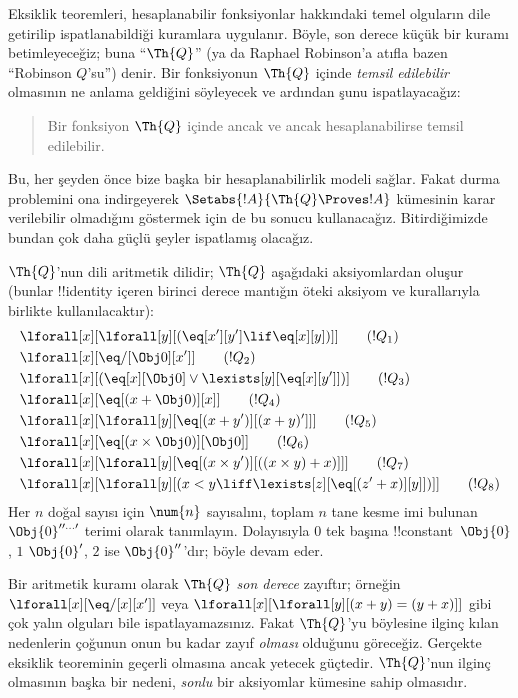 


Eksiklik teoremleri, hesaplanabilir fonksiyonlar hakkındaki temel olguların
dile getirilip ispatlanabildiği kuramlara uygulanır. Böyle, son derece küçük
bir kuramı betimleyeceğiz; buna ``$\Th{Q}$'' (ya da Raphael Robinson'a
atıfla bazen ``Robinson $Q$'su'') denir. Bir fonksiyonun $\Th{Q}$ içinde
\emph{temsil edilebilir} olmasının ne anlama geldiğini söyleyecek ve ardından
şunu ispatlayacağız:
\begin{quote}
  Bir fonksiyon $\Th{Q}$ içinde ancak ve ancak hesaplanabilirse temsil
  edilebilir.
\end{quote}
Bu, her şeyden önce bize başka bir hesaplanabilirlik modeli sağlar. Fakat
durma problemini ona indirgeyerek $\Setabs{!A}{\Th{Q} \Proves !A}$ kümesinin
karar verilebilir olmadığını göstermek için de bu sonucu kullanacağız.
Bitirdiğimizde bundan çok daha güçlü şeyler ispatlamış olacağız.

$\Th{Q}$'nun dili aritmetik dilidir; $\Th{Q}$ aşağıdaki aksiyomlardan oluşur
(bunlar !!{identity} içeren birinci derece mantığın öteki aksiyom ve
kurallarıyla birlikte kullanılacaktır):
\begin{align*}
& \lforall[x][\lforall[y][(\eq[x'][y'] \lif \eq[x][y])]] \tag{$!Q_1$}\\
& \lforall[x][\eq/[\Obj 0][x']] \tag{$!Q_2$}\\
& \lforall[x][(\eq[x][\Obj 0] \lor \lexists[y][\eq[x][y']])] \tag{$!Q_3$}\\
& \lforall[x][\eq[(x + \Obj 0)][x]] \tag{$!Q_4$}\\
& \lforall[x][\lforall[y][\eq[(x + y')][(x + y)']]] \tag{$!Q_5$}\\
& \lforall[x][\eq[(x \times \Obj 0)][\Obj 0]] \tag{$!Q_6$}\\
& \lforall[x][\lforall[y][\eq[(x \times y')][((x \times y) + x)]]] \tag{$!Q_7$}\\
& \lforall[x][\lforall[y][(x < y \liff \lexists[z][\eq[(z' + x)][y]])]] \tag{$!Q_8$}
\end{align*}
Her $n$ doğal sayısı için $\num{n}$ sayısalını, toplam $n$ tane kesme imi
bulunan $\Obj{0}^{\prime\prime\ldots\prime}$ terimi olarak tanımlayın.
Dolayısıyla $\num{0}$ tek başına !!{constant}~$\Obj{0}$, $\num{1}$
$\Obj{0}'$, $\num{2}$ ise $\Obj{0}''$'dır; böyle devam eder.

Bir aritmetik kuramı olarak $\Th{Q}$ \emph{son derece} zayıftır; örneğin
$\lforall[x][\eq/[x][x']]$ veya $\lforall[x][\lforall[y][(x + y) = (y +
    x)]]$ gibi çok yalın olguları bile ispatlayamazsınız. Fakat
$\Th{Q}$'yu böylesine ilginç kılan nedenlerin çoğunun onun bu kadar zayıf
\emph{olması} olduğunu göreceğiz. Gerçekte eksiklik teoreminin geçerli
olmasına ancak yetecek güçtedir. $\Th{Q}$'nun ilginç olmasının başka bir
nedeni, \emph{sonlu} bir aksiyomlar kümesine sahip olmasıdır.


